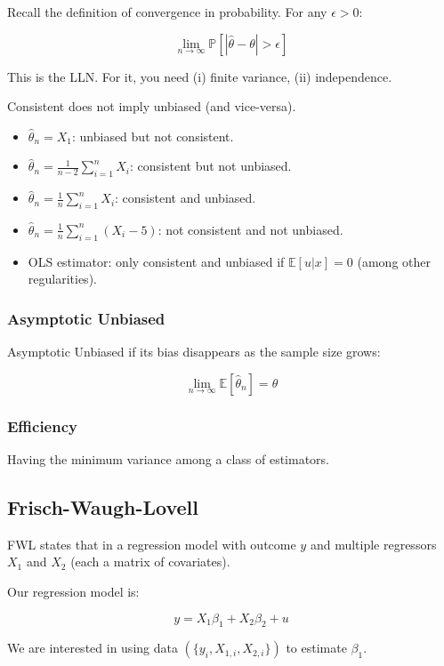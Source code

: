 \documentclass{article}
\begin{document}
Recall the definition of convergence in probability. For any $\epsilon > 0$:

$$
\lim_{n \to \infty} \mathbb{P}[|\hat{\theta} - \theta| > \epsilon]
$$

This is the LLN. For it, you need (i) finite variance, (ii) independence.

Consistent does not imply unbiased (and vice-versa).

\begin{itemize}
    \item $\hat{\theta}_n = X_1$: unbiased but not consistent.
    \item $\hat{\theta}_n = \frac{1}{n - 2} \sum_{i = 1}^n X_i$: consistent but not unbiased.
    \item $\hat{\theta}_n = \frac{1}{n} \sum_{i = 1}^n X_i$: consistent and unbiased.
    \item $\hat{\theta}_n = \frac{1}{n} \sum_{i = 1}^n (X_i - 5)$: not consistent and not unbiased.
    \item OLS estimator: only consistent and unbiased if $\mathbb{E}[u|x] = 0$ (among other regularities).
\end{itemize} 

\subsubsection*{Asymptotic Unbiased}
Asymptotic Unbiased if its bias disappears as the sample size grows:

$$
\lim_{n \to \infty} \mathbb{E}[\hat{\theta}_n] = \theta
$$

\subsubsection*{Efficiency}
Having the minimum variance among a class of estimators.

\subsection*{Frisch-Waugh-Lovell}

FWL states that in a regression model with outcome $y$ and multiple regressors $X_1$ and $X_2$ (each a matrix of covariates).

Our regression model is:

$$
y = X_1 \beta_1 + X_2 \beta_2 + u
$$

We are interested in using data $(\{ y_i, X_{1, i}, X_{2, i} \})$ to estimate $\beta_1$.
\end{document}
